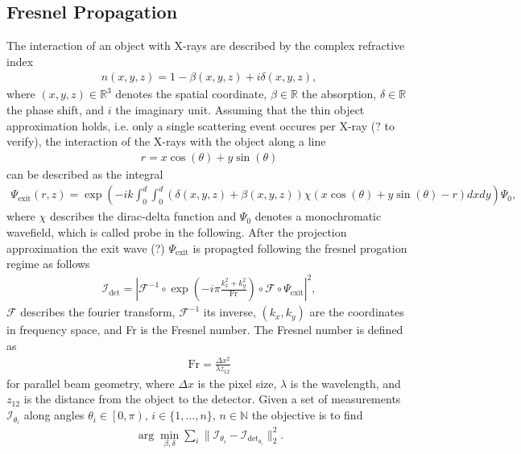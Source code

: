 \documentclass[a4paper, 10pt]{article}
\begin{document}
\subsection{Fresnel Propagation}
The interaction of an object with X-rays are described by the complex refractive index
\begin{align}
	n \left( x,y,z \right) = 1 - \beta \left( x,y,z \right) + i \delta \left( x,y,z \right),
	\label{eq:refractive-index}
\end{align}
where $\left( x,y,z \right) \in \mathbb{R}^{3}$ denotes the spatial coordinate, $\beta \in \mathbb{R}$ the absorption, $\delta \in \mathbb{R}$ the phase shift, and $i$ the imaginary unit.
Assuming that the thin object approximation holds, i.e. only a single scattering event occures per X-ray (? to verify), the interaction of the X-rays with the object along a line 
\begin{align}
	r  = x \cos \left( \theta \right) + y \sin \left( \theta \right)  
	\label{eq:}
\end{align}
can be described as the integral
\begin{align}
	\Psi_{\text{exit}} \left( r, z \right) = \exp \left(  
		- ik \int_{0}^{d} \int_{0}^{d}
			\left( 
				\delta \left( x,y,z  \right) +  \beta \left( x,y,z \right) 
			\right) 
			\chi 
			\left( x \cos \left( \theta \right) + y \sin \left( \theta \right) - r \right) dxdy \right) \Psi_{0},
	\label{eq:thin-object}
\end{align}
where $\chi$ describes the dirac-delta function and $\Psi_{0}$ denotes a monochromatic wavefield, which is called probe in the following. 
After the projection approximation the exit wave (?) $\Psi_{\text{exit}}$ is propagted following the fresnel progation regime as follows 
\begin{align}
	\mathcal{I}_{\text{det}} = \left| \mathcal{F}^{-1} \circ \exp\left( -i \pi \frac{k_{x}^{2} + k_{y}^{2}}{\text{Fr}} \right) \circ \mathcal{F}  \circ \Psi_{\text{exit}} \right|^{2}, 
	\label{eq:Fresnel}
\end{align}
$\mathcal{F}$ describes the fourier transform, $\mathcal{F}^{-1}$ its inverse, $\left( k_{x}, k_{y} \right)$ are the coordinates in frequency space, and Fr is the Fresnel number.
The Fresnel number is defined as 
\begin{align}
	\text{Fr} = \frac{\Delta x^{2}}{\lambda z_{12}}
	\label{eq:fresnel}
\end{align}
for parallel beam geometry, where $\Delta x$ is the pixel size, $\lambda$ is the wavelength, and $z_{12}$ is the distance from the object to the detector. 
Given a set of measurements $\mathcal{I}_{\theta_{i}}$ along angles $\theta_{i} \in \left[ 0, \pi \right)$, $i \in \lbrace 1, \dots , n \rbrace$, $n \in \mathbb{N}$ the objective is to find 
\begin{align}
	\arg\min_{\beta, \delta} \sum_{i} \|  \mathcal{I}_{\theta_{i}} - \mathcal{I}_{\text{det}_{\theta_{i}}} \| ^{2}_{2}.
 	\label{eq:obj_function}
\end{align}
\end{document}
